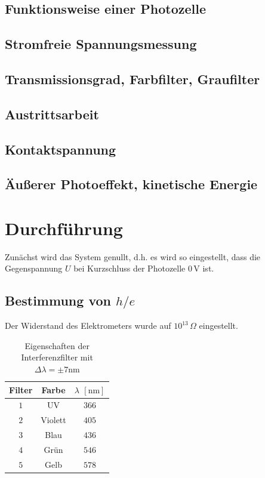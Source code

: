 \documentclass[12pt,a4paper]{scrartcl}
\numberwithin{equation}{section} %
\begin{document}
\subsection{Funktionsweise einer Photozelle}
\subsection{Stromfreie Spannungsmessung}
\subsection{Transmissionsgrad, Farbfilter, Graufilter}
\subsection{Austrittsarbeit}
\subsection{Kontaktspannung}
\subsection{Äußerer Photoeffekt, kinetische Energie}

\clearpage
\hypertarget{durchfuxfchrung}{%
\section{Durchführung}\label{durchfuxfchrung}}
Zunächst wird das System genullt, d.h. es wird so eingestellt, dass die Gegenspannung $U$ bei Kurzschluss der Photozelle $0\mathrm{\,V}$ ist.

\subsection{Bestimmung von $h/e$}
Der Widerstand des Elektrometers wurde auf $10^{13}\,\Omega$ eingestellt.

\begin{table}[h!]
	\centering
	\begin{tabular}{c|c|c}
		Filter & Farbe & $\lambda$ $[\mathrm{nm}]$ \\
		\hline
		$1$ & UV & $366$ \\
		$2$ & Violett & $405$ \\
		$3$ & Blau & $436$ \\
		$4$ & Grün & $546$ \\
		$5$ & Gelb & $578$ \\
	\end{tabular}
	\caption{Eigenschaften der Interferenzfilter mit $\Delta \lambda = \pm 7\mathrm{nm}$}
	\label{tab:Interferenzfilter}
\end{table}
\end{document}
